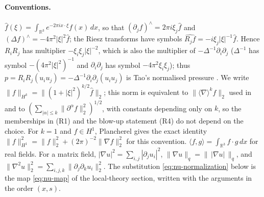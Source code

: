 \documentclass[11pt]{article}
\theoremstyle{definition}
\theoremstyle{plain}
\newcommand{\R}{\mathbb R}
\newcommand{\norm}[1]{\lVert #1\rVert}
\begin{document}
\paragraph{Conventions.}
$\hat f(\xi)=\int_{\R^3}e^{-2\pi ix\cdot\xi}f(x)\,dx$, so that
$(\partial_jf)^\wedge=2\pi i\xi_j\hat f$ and
$(\Delta f)^\wedge=-4\pi^2|\xi|^2\hat f$; the Riesz transforms have symbols
$\widehat{R_jf}=-i\xi_j|\xi|^{-1}\hat f$.  Hence $R_iR_j$ has multiplier
$-\xi_i\xi_j|\xi|^{-2}$, which is also the multiplier of
$-\Delta^{-1}\partial_i\partial_j$ ($\Delta^{-1}$ has symbol
$-(4\pi^2|\xi|^2)^{-1}$ and $\partial_i\partial_j$ has symbol
$-4\pi^2\xi_i\xi_j$); thus $p=R_iR_j(u_iu_j)=-\Delta^{-1}\partial_i\partial_j(u_iu_j)$
is Tao's normalised pressure \cite[eq.~(9)]{Tao2013}.
We write $\norm{f}_{H^k}=\norm{(1+|\xi|^2)^{k/2}\hat f}_2$; this norm is
equivalent to $\norm{\langle\nabla\rangle^kf}_2$ used in \cite{Tao2013} and to
$(\sum_{|\alpha|\leq k}\norm{\partial^\alpha f}_2^2)^{1/2}$, with constants
depending only on $k$, so the memberships in (R1) and the blow-up
statement (R4) do not depend on the choice.  For $k=1$ and $f\in H^1$,
Plancherel gives the exact identity
$\norm f_{H^1}^2=\norm f_2^2+(2\pi)^{-2}\norm{\nabla f}_2^2$ for this
convention.  $\langle f,g\rangle=\int_{\R^3}f\cdot g\,dx$ for real fields.
For a matrix field, $|\nabla u|^2=\sum_{i,j}|\partial_ju_i|^2$,
$\norm{\nabla u}_q=\norm{\,|\nabla u|\,}_q$, and
$\norm{\nabla^2u}_2^2=\sum_{i,j,k}\norm{\partial_j\partial_ku_i}_2^2$.
The substitution \eqref{eq:nu-normalization} below is the map
\eqref{eq:nu-map} of the local-theory section, written with the arguments
in the order $(x,s)$.
\end{document}
